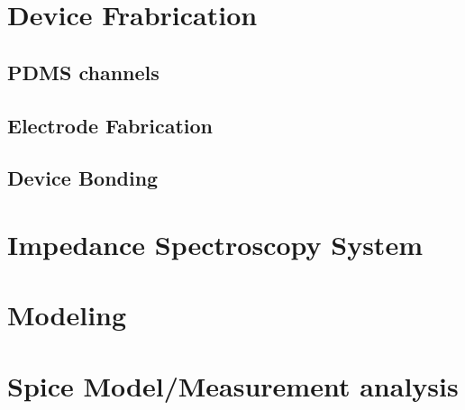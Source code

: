 
\section{Device Frabrication}

\subsection{PDMS channels}

\subsection{Electrode Fabrication}

\subsection{Device Bonding}


\section{Impedance Spectroscopy System}


\section{Modeling}


\section{Spice Model/Measurement analysis}